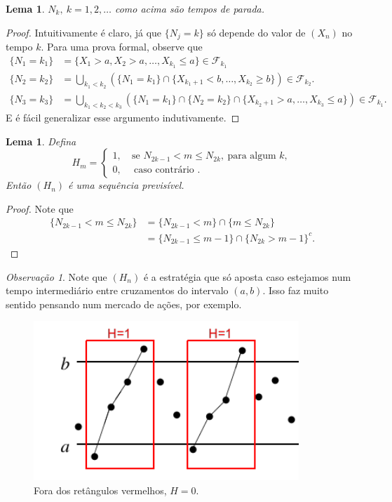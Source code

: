 \documentclass[12pt,a4paper,oneside]{book}
\newtheorem{lemma}[theorem]{Lema}
\theoremstyle{definition}
\theoremstyle{remark}
\newtheorem{remark}[theorem]{Observa\c{c}\~ao}
\numberwithin{equation}{section}
\newcommand{\F}{\mathcal{F}}
\begin{document}
\begin{lemma}
$N_k,\ k= 1,2,\dots$ como acima são tempos de parada.
\end{lemma}
\begin{proof}
Intuitivamente é claro, já que $\{N_j=k\}$ só depende do valor de $(X_n)$ no tempo $k.$
Para uma prova formal, observe que
\begin{align*}
\{ N_1 =k_1 \} &= \{ X_1> a, X_2> a,\dots, X_{k_1}\leq a  \}\in \F_{k_1}\\
\{ N_2 =k_2 \} &= \bigcup_{k_1<k_2} (\{N_1=k_1\}\cap \{X_{k_1+1}<b,\dots,X_{k_2}\geq b\} )\in \F_{k_2}.\\
\{ N_3 =k_3 \} &= \bigcup_{k_1<k_2<k_3} (\{N_1=k_1\}\cap\{N_2 = k_2\}\cap \{X_{k_2+1}>a,\dots,X_{k_3}\leq a\} )\in \F_{k_1}.
\end{align*}
E é fácil generalizar esse argumento indutivamente.
\end{proof}





\begin{lemma}\label{lema-H-estrategia cruzamento}
Defina
$$H_m = \begin{cases}
1,\   & \textrm{se } N_{2k-1}<m\leq N_{2k},\  \textrm{para algum }k,\\
0,&\ \textrm{caso contrário }.
\end{cases} $$
Então $(H_n)$ é uma sequência previsível.
\end{lemma}
\begin{proof}
Note que
\begin{align*}
\{N_{2k-1}<m\leq N_{2k}\} &= \{N_{2k-1}<m\}\cap \{m\leq N_{2k}\}\\
& = \{N_{2k-1}\leq m-1\}\cap \{ N_{2k} > m-1 \}^c.
\end{align*}
\end{proof}


\begin{remark}
Note que $(H_n)$ é a estratégia que só aposta  caso estejamos num tempo intermediário entre cruzamentos do intervalo $(a,b)$. Isso faz muito sentido pensando num mercado de ações, por exemplo.
\end{remark}

\begin{figure}[H]
\centering %
\includegraphics[width=10cm]{upcrossingHn} %
\caption{Fora dos retângulos vermelhos, $H=0$.}
\end{figure}
 
\end{document}
